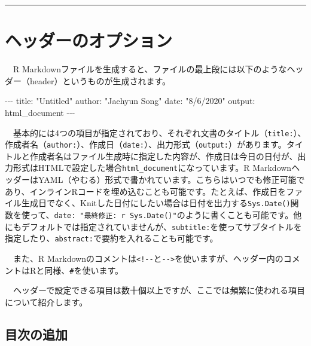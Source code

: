 \documentclass[
  a4paper,
  pandoc,
  ja=standard,
  jafont=haranoaji]{bxjsbook}
\newenvironment{Shaded}{\begin{snugshade}}{\end{snugshade}}
\newcommand{\AttributeTok}[1]{\textcolor[rgb]{0.00,0.48,0.65}{#1}}
\newcommand{\FunctionTok}[1]{\textcolor[rgb]{0.28,0.35,0.67}{#1}}
\newcommand{\KeywordTok}[1]{\textcolor[rgb]{0.00,0.48,0.65}{#1}}
\newcommand{\PreprocessorTok}[1]{\textcolor[rgb]{0.68,0.00,0.00}{#1}}
\newcommand{\StringTok}[1]{\textcolor[rgb]{0.13,0.47,0.30}{#1}}
\begin{document}
\begin{center}\rule{0.5\linewidth}{0.5pt}\end{center}

\hypertarget{sec-rmarkdown_header}{%
\section{ヘッダーのオプション}\label{sec-rmarkdown_header}}

　R
Markdownファイルを生成すると、ファイルの最上段には以下のようなヘッダー（header）というものが生成されます。

\begin{Shaded}
\begin{Highlighting}[]
\PreprocessorTok{{-}{-}{-}}
\FunctionTok{title}\KeywordTok{:}\AttributeTok{ }\StringTok{"Untitled"}
\FunctionTok{author}\KeywordTok{:}\AttributeTok{ }\StringTok{"Jaehyun Song"}
\FunctionTok{date}\KeywordTok{:}\AttributeTok{ }\StringTok{"8/6/2020"}
\FunctionTok{output}\KeywordTok{:}\AttributeTok{ html\_document}
\PreprocessorTok{{-}{-}{-}}
\end{Highlighting}
\end{Shaded}

　基本的には4つの項目が指定されており、それぞれ文書のタイトル（\texttt{title:}）、作成者名（\texttt{author:}）、作成日（\texttt{date:}）、出力形式（\texttt{output:}）があります。タイトルと作成者名はファイル生成時に指定した内容が、作成日は今日の日付が、出力形式はHTMLで設定した場合\texttt{html\_document}になっています。R
MarkdownヘッダーはYAML（やむる）形式で書かれています。こちらはいつでも修正可能であり、インラインRコードを埋め込むことも可能です。たとえば、作成日をファイル生成日でなく、Knitした日付にしたい場合は日付を出力する\texttt{Sys.Date()}関数を使って、\texttt{date:\ "最終修正:\ \textasciigrave{}r\ Sys.Date()\textasciigrave{}"}のように書くことも可能です。他にもデフォルトでは指定されていませんが、\texttt{subtitle:}を使ってサブタイトルを指定したり、\texttt{abstract:}で要約を入れることも可能です。

　また、R
Markdownのコメントは\texttt{\textless{}!-\/-}と\texttt{-\/-\textgreater{}}を使いますが、ヘッダー内のコメントはRと同様、\texttt{\#}を使います。

　ヘッダーで設定できる項目は数十個以上ですが、ここでは頻繁に使われる項目について紹介します。

\hypertarget{ux76eeux6b21ux306eux8ffdux52a0}{%
\subsection{目次の追加}\label{ux76eeux6b21ux306eux8ffdux52a0}}
\end{document}
